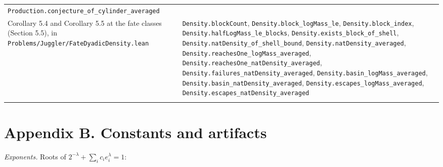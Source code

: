 \documentclass[11pt,a4paper]{article}
\begin{document}
\begin{longtable}[]{@{}
  >{\raggedright\arraybackslash}p{}
  >{\raggedright\arraybackslash}p{}@{}}
\texttt{\nolinkurl{Production.conjecture_of_cylinder_averaged}} \\
Corollary 5.4 and Corollary 5.5 at the fate classes (Section 5.5), in
\texttt{\nolinkurl{Problems/Juggler/FateDyadicDensity.lean}} &
\texttt{\nolinkurl{Density.blockCount}},
\texttt{\nolinkurl{Density.block_logMass_le}},
\texttt{\nolinkurl{Density.block_index}},
\texttt{\nolinkurl{Density.halfLogMass_le_blocks}},
\texttt{\nolinkurl{Density.exists_block_of_shell}},
\texttt{\nolinkurl{Density.natDensity_of_shell_bound}},
\texttt{\nolinkurl{Density.natDensity_averaged}},
\texttt{\nolinkurl{Density.reachesOne_logMass_averaged}},
\texttt{\nolinkurl{Density.reachesOne_natDensity_averaged}},
\texttt{\nolinkurl{Density.failures_natDensity_averaged}},
\texttt{\nolinkurl{Density.basin_logMass_averaged}},
\texttt{\nolinkurl{Density.basin_natDensity_averaged}},
\texttt{\nolinkurl{Density.escapes_logMass_averaged}},
\texttt{\nolinkurl{Density.escapes_natDensity_averaged}} \\*
\end{longtable}

\endgroup

\section{Appendix B. Constants and
artifacts}\label{appendix-b.-constants-and-artifacts}

\emph{Exponents.} Roots of \(2^{-\lambda}+\sum_ic_ie_i^{\lambda}=1\):

\begingroup\small
\end{document}
